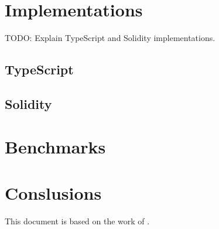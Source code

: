 \documentclass{article}
\begin{document}
\bigbreak

\section{Implementations}

TODO: Explain TypeScript and Solidity implementations.

\bigbreak

\subsection{TypeScript}

\bigbreak

\subsection{Solidity}

\bigbreak

\section{Benchmarks}

\section{Conslusions}

This document is based on the work of \cite{semaphorev1whitepaper}.

\sloppy

\printbibliography

\end{document}
